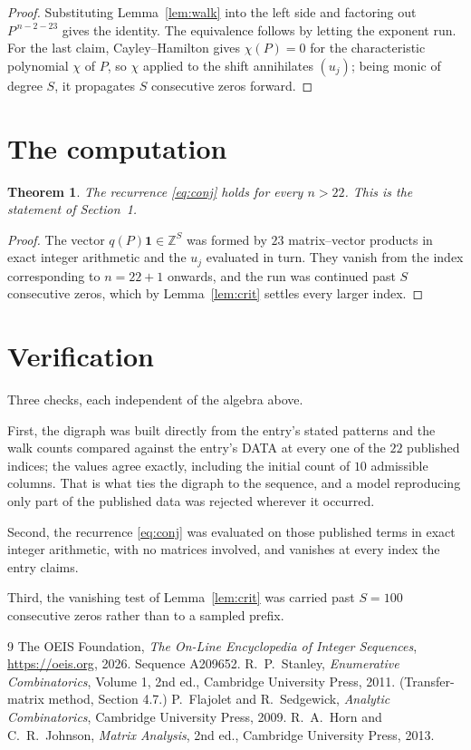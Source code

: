 \documentclass[11pt,a4paper]{article}
\theoremstyle{plain}
\newtheorem{theorem}{Theorem}
\theoremstyle{definition}
\begin{document}
\begin{proof}
Substituting Lemma~\ref{lem:walk} into the left side and factoring out
$P^{\,n-2-23}$ gives the identity. The equivalence follows by letting the exponent
run. For the last claim, Cayley--Hamilton gives $\chi(P)=0$ for the characteristic
polynomial $\chi$ of $P$, so $\chi$ applied to the shift annihilates $(u_j)$; being monic of
degree $S$, it propagates $S$ consecutive zeros forward.
\end{proof}

\section{The computation}

\begin{theorem}
The recurrence \eqref{eq:conj} holds for every $n>22$. This is the statement of
Section~1.
\end{theorem}

\begin{proof}
The vector $q(P)\mathbf{1}\in\mathbb{Z}^{S}$ was formed by $23$ matrix--vector
products in exact integer arithmetic and the $u_j$ evaluated in turn. They vanish from the
index corresponding to $n=22+1$ onwards, and the run was continued past $S$ consecutive
zeros, which by Lemma~\ref{lem:crit} settles every larger index.
\end{proof}

\section{Verification}

Three checks, each independent of the algebra above.

First, the digraph was built directly from the entry's stated patterns and the walk counts
compared against the entry's DATA at every one of the $22$ published indices; the
values agree exactly, including the initial count of $10$ admissible columns. That is
what ties the digraph to the sequence, and a model reproducing only part of the published
data was rejected wherever it occurred.

Second, the recurrence \eqref{eq:conj} was evaluated on those published terms in exact
integer arithmetic, with no matrices involved, and vanishes at every index the entry claims.

Third, the vanishing test of Lemma~\ref{lem:crit} was carried past $S=100$ consecutive
zeros rather than to a sampled prefix.

\begin{thebibliography}{9}
 The OEIS Foundation, \emph{The On-Line Encyclopedia of Integer
Sequences}, \url{https://oeis.org}, 2026. Sequence A209652.
 R.~P.~Stanley, \emph{Enumerative Combinatorics}, Volume 1, 2nd ed.,
Cambridge University Press, 2011. (Transfer-matrix method, Section 4.7.)
 P.~Flajolet and R.~Sedgewick, \emph{Analytic Combinatorics}, Cambridge
University Press, 2009.
 R.~A.~Horn and C.~R.~Johnson, \emph{Matrix Analysis}, 2nd ed., Cambridge
University Press, 2013.
\end{thebibliography}
\end{document}
